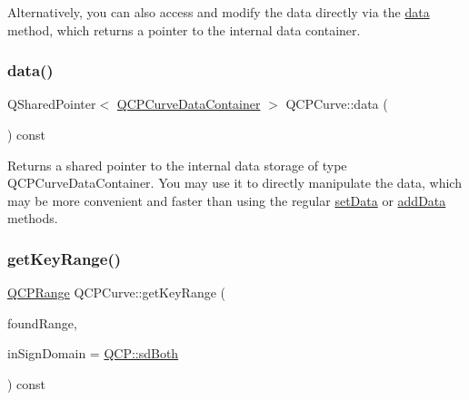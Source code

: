 Alternatively, you can also access and modify the data directly via the \hyperlink{class_q_c_p_curve_a761492fd00b1ab7cb18ce23c118c6c60}{data} method, which returns a pointer to the internal data container. \mbox{\label{class_q_c_p_curve_a761492fd00b1ab7cb18ce23c118c6c60}} 
\subsubsection{\texorpdfstring{data()}{data()}}
{\footnotesize\ttfamily Q\+Shared\+Pointer$<$ \hyperlink{class_q_c_p_data_container}{Q\+C\+P\+Curve\+Data\+Container} $>$ Q\+C\+P\+Curve\+::data (\begin{DoxyParamCaption}{ }\end{DoxyParamCaption}) const\hspace{0.3cm}{\ttfamily [inline]}}

Returns a shared pointer to the internal data storage of type Q\+C\+P\+Curve\+Data\+Container. You may use it to directly manipulate the data, which may be more convenient and faster than using the regular \hyperlink{class_q_c_p_curve_a41246850d2e080bc57183ca19cd4135e}{set\+Data} or \hyperlink{class_q_c_p_curve_a73edf394b94f3f24f07518e30565a07f}{add\+Data} methods. \mbox{\label{class_q_c_p_curve_a22d09087f78f254731197cc0b8783299}} 
\subsubsection{\texorpdfstring{get\+Key\+Range()}{getKeyRange()}}
{\footnotesize\ttfamily \hyperlink{class_q_c_p_range}{Q\+C\+P\+Range} Q\+C\+P\+Curve\+::get\+Key\+Range (\begin{DoxyParamCaption}\item[{bool \&}]{found\+Range,  }\item[{\hyperlink{namespace_q_c_p_afd50e7cf431af385614987d8553ff8a9}{Q\+C\+P\+::\+Sign\+Domain}}]{in\+Sign\+Domain = {\ttfamily \hyperlink{namespace_q_c_p_afd50e7cf431af385614987d8553ff8a9aa38352ef02d51ddfa4399d9551566e24}{Q\+C\+P\+::sd\+Both}} }\end{DoxyParamCaption}) const\hspace{0.3cm}{\ttfamily [virtual]}}

